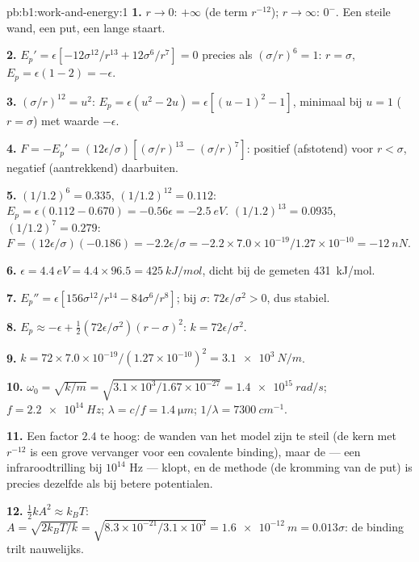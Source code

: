 \begin{solution}{pb:b1:work-and-energy:1}
\textbf{1.} $r \to 0$: $+\infty$ (de term $r^{-12}$); $r \to \infty$:
$0^-$. Een steile wand, een put, een lange staart.

\textbf{2.} $E_p' = \epsilon[-12\sigma^{12}/r^{13} + 12\sigma^6/r^7] = 0$ precies als
$(\sigma/r)^6 = 1$: $r = \sigma$, $E_p = \epsilon(1 - 2) = -\epsilon$.

\textbf{3.} $(\sigma/r)^{12} = u^2$: $E_p = \epsilon(u^2 - 2u) = \epsilon[(u - 1)^2
- 1]$, minimaal bij $u = 1$ ($r = \sigma$) met waarde $-\epsilon$.

\textbf{4.} $F = -E_p' = (12\epsilon/\sigma)[(\sigma/r)^{13} - (\sigma/r)^7]$:
positief (afstotend) voor $r < \sigma$, negatief (aantrekkend) daarbuiten.

\textbf{5.} $(1/1.2)^6 = 0.335$, $(1/1.2)^{12} = 0.112$: $E_p = \epsilon(0.112
- 0.670) = -0.56\epsilon = \qty{-2.5}{eV}$. $(1/1.2)^{13} = 0.0935$,
$(1/1.2)^7 = 0.279$: $F = (12\epsilon/\sigma)(-0.186) = -2.2\epsilon/\sigma =
-2.2 \times 7.0\times10^{-19}/1.27\times10^{-10} = \qty{-12}{nN}$.

\textbf{6.} $\epsilon = \qty{4.4}{eV} = 4.4 \times 96.5 = \qty{425}{kJ/mol}$,
dicht bij de gemeten \qty{431}{kJ/mol}.

\textbf{7.} $E_p'' = \epsilon[156\sigma^{12}/r^{14} - 84\sigma^6/r^8]$; bij
$\sigma$: $72\epsilon/\sigma^2 > 0$, dus stabiel.

\textbf{8.} $E_p \approx -\epsilon + \tfrac12(72\epsilon/\sigma^2)(r - \sigma)^2$:
$k = 72\epsilon/\sigma^2$.

\textbf{9.} $k = 72 \times 7.0\times10^{-19}/(1.27\times10^{-10})^2 =
\qty{3.1e3}{N/m}$.

\textbf{10.} $\omega_0 = \sqrt{k/m} = \sqrt{3.1\times10^3/1.67\times10^{-27}} =
\qty{1.4e15}{rad/s}$; $f = \qty{2.2e14}{Hz}$; $\lambda = c/f = \qty{1.4}{\micro m}$;
$1/\lambda = \qty{7300}{cm^{-1}}$.

\textbf{11.} Een factor $2.4$ te hoog: de wanden van het model zijn te steil
(de kern met $r^{-12}$ is een grove vervanger voor een covalente binding), maar de
 --- een infraroodtrilling bij $10^{14}$ Hz --- klopt,
en de methode (de kromming van de put) is precies dezelfde als bij
betere potentialen.

\textbf{12.} $\tfrac12 kA^2 \approx k_BT$: $A = \sqrt{2k_BT/k} = \sqrt{8.3\times
10^{-21}/3.1\times10^3} = \qty{1.6e-12}{m} = 0.013\sigma$: de binding
trilt nauwelijks.


\end{solution}
